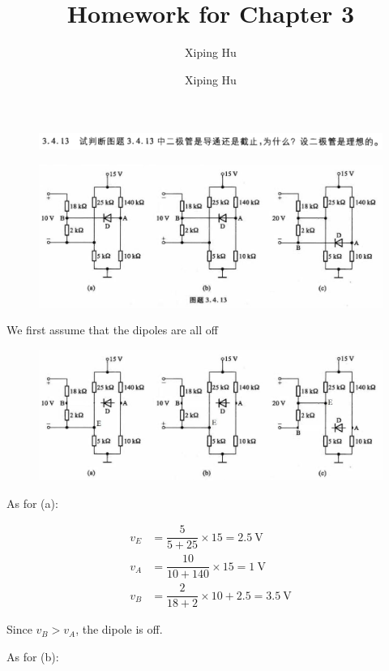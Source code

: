 \documentclass{article}
\author{Xiping Hu}
\author{Xiping Hu}
\affil{http://thehxp.tech/}
\title{Homework for Chapter 3}
\begin{document}
\maketitle

\begin{figure}[H]
  \centering
  \includegraphics[width=\linewidth]{figures/Problem2-1}
  \label{fig:}
\end{figure}
\begin{figure}[H]
  \centering
  \includegraphics[width=0.7\linewidth]{figures/Problem2-2}
  \label{fig:}
\end{figure}

We first assume that the dipoles are all off

\begin{figure}[H]
  \centering
  \includegraphics[width=0.7\linewidth]{figures/Problem2-3}
  \label{fig:}
\end{figure}

As for (a):

\begin{equation*}
  \begin{aligned}
    v_E &= \dfrac{5}{5 + 25} \times 15 = 2.5 \  \mathrm{V} \\
    v_A &= \dfrac{10}{10 + 140} \times 15 = 1 \  \mathrm{V} \\
    v_B &= \dfrac{2}{18 + 2} \times 10 + 2.5 = 3.5 \  \mathrm{V} 
  \end{aligned}
\end{equation*}

Since $v_B > v_A$, the dipole is off.

As for (b):
\end{document}
